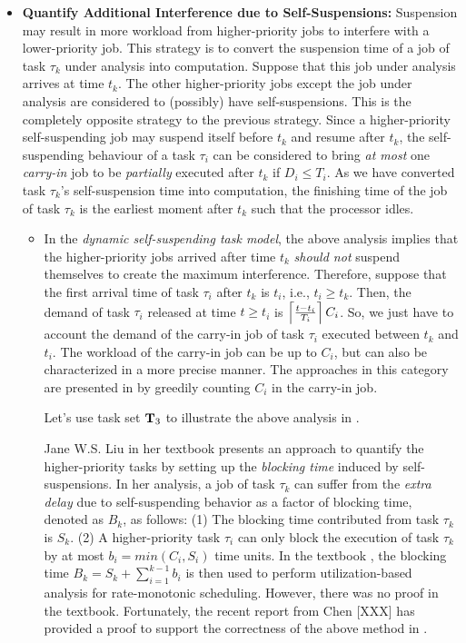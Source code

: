 \begin{itemize}
\item {\bf Quantify Additional Interference due to Self-Suspensions:} Suspension may result in more workload from higher-priority jobs to interfere with a lower-priority job. This strategy is to convert the suspension time of a job of task $\tau_k$ under analysis into computation. Suppose that this job under analysis arrives at time $t_k$. The other higher-priority jobs except the job under analysis are considered to (possibly) have self-suspensions. This is the completely opposite strategy to the previous strategy. Since a higher-priority self-suspending job may suspend itself before $t_k$ and resume after $t_k$, the self-suspending behaviour of a task $\tau_i$ can be considered to bring \emph{at most} one \emph{carry-in} job to be \emph{partially} executed after $t_k$ if $D_i \leq T_i$. As we have converted task $\tau_k$'s self-suspension time into computation, the finishing time of the job of task $\tau_k$ is the earliest moment after $t_k$ such that the processor idles. 
\begin{itemize}
\item In the \emph{dynamic self-suspending task model}, the above analysis implies that the higher-priority jobs arrived after time $t_k$ \emph{should not} suspend themselves to create the maximum interference. Therefore, suppose that the first arrival time of task $\tau_i$ after $t_k$ is $t_i$, i.e., $t_i \geq t_k$. Then, the demand of task $\tau_i$ released at time $t \geq t_i$ is $\left\lceil{\frac{t-t_i}{T_i} }\right\rceil C_i$. So, we just have to account the demand of the carry-in job of task $\tau_i$ executed between $t_k$ and $t_i$. The workload of the carry-in job can be up to $C_i$, but can also be characterized in a more precise manner. The approaches in this category are presented in \cite{huangpass:dac2015,LiuChen:rtss2014} by greedily counting $C_i$ in the carry-in job. 

Let's use task set ${\bf T}_3$ to illustrate the above analysis in \cite{huangpass:dac2015,LiuChen:rtss2014}. 

Jane W.S. Liu in her textbook \cite[Page 164-165]{Liu:2000:RS:518501} presents an approach to quantify the higher-priority tasks by setting up the \emph{blocking time} induced by self-suspensions. In her analysis, a job of task $\tau_k$ can suffer from the \emph{extra delay} due to self-suspending behavior as a factor of blocking time, denoted as $B_k$, as follows: (1) The blocking time contributed from task $\tau_k$ is $S_k$. (2) A higher-priority task $\tau_i$ can only block the execution of task $\tau_k$ by at most $b_i=min(C_i, S_i)$ time units. In the textbook \cite{Liu:2000:RS:518501}, the blocking time $B_k=S_k+\sum_{i=1}^{k-1} b_i$ is then used to perform utilization-based analysis for rate-monotonic scheduling. However, there was no proof in the textbook. Fortunately, the recent report from Chen [XXX] has provided a proof to support the correctness of the above method in \cite{Liu:2000:RS:518501}.


\end{itemize}
\end{itemize}
